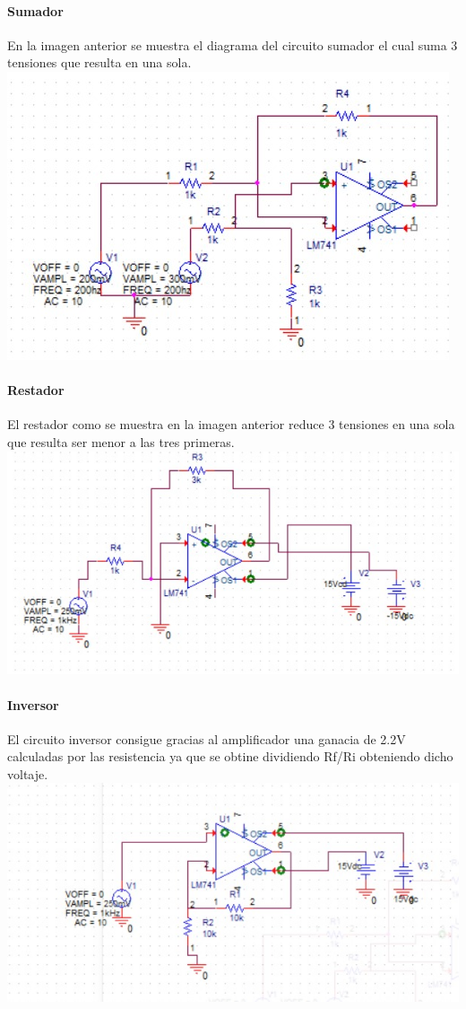 \documentclass[12pt,a4paper]{report}
\begin{document}
\paragraph{Sumador}
En la imagen anterior se muestra el diagrama del circuito sumador el cual suma 3 tensiones que resulta en una sola.
\\
\includegraphics[scale=.5]{re.jpg} 
\paragraph{Restador}
El restador como se muestra en la imagen anterior reduce 3 tensiones en una sola que resulta ser menor a las tres primeras.
\\
\includegraphics[scale=.5]{in.jpg} 
\paragraph{Inversor}
El circuito inversor consigue gracias al amplificador una ganacia de 2.2V calculadas por las resistencia ya que se obtine dividiendo Rf/Ri
obteniendo dicho voltaje.
\\
\includegraphics[scale=.5]{no in.jpg} 
\end{document}
